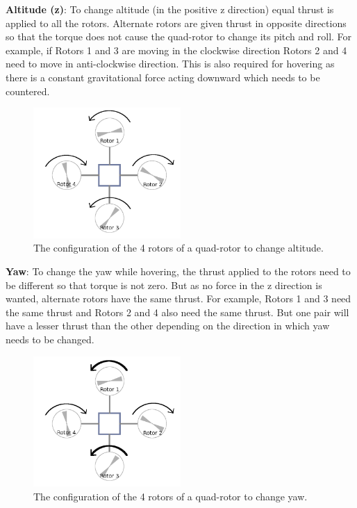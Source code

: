 \documentclass[hidelinks,BTech]{iitmdiss}
\begin{document}
{\bf Altitude (z)}: To change altitude (in the positive z direction) equal thrust is applied to all the rotors. Alternate rotors are given thrust in opposite directions so that the torque does not cause the quad-rotor to change its pitch and roll. For example, if Rotors 1 and 3 are moving in the clockwise direction Rotors 2 and 4 need to move in anti-clockwise direction. This is also required for hovering as there is a constant gravitational force acting downward which needs to be countered.

\begin{figure}[H]
  \centering
    \includegraphics[width=0.5\textwidth]{quadrotor_rotors_altitude.png}
    \caption{The configuration of the 4 rotors of a quad-rotor to change altitude.}
\end{figure}

{\bf Yaw}: To change the yaw while hovering, the thrust applied to the rotors need to be different so that torque is not zero. But as no force in the z direction is wanted, alternate rotors have the same thrust. For example, Rotors 1 and 3 need the same thrust and Rotors 2 and 4 also need the same thrust. But one pair will have a lesser thrust than the other depending on the direction in which yaw needs to be changed.

\begin{figure}[H]
  \centering
    \includegraphics[width=0.5\textwidth]{quadrotor_rotors_yaw.png}
    \caption{The configuration of the 4 rotors of a quad-rotor to change yaw.}
\end{figure}
\end{document}
